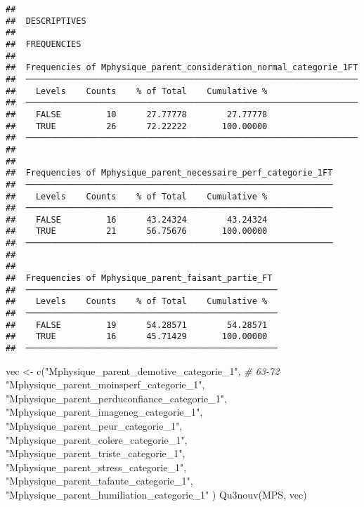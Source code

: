 \documentclass[
]{article}
\newenvironment{Shaded}{\begin{snugshade}}{\end{snugshade}}
\newcommand{\CommentTok}[1]{\textcolor[rgb]{0.56,0.35,0.01}{\textit{#1}}}
\newcommand{\FunctionTok}[1]{\textcolor[rgb]{0.00,0.00,0.00}{#1}}
\newcommand{\NormalTok}[1]{#1}
\newcommand{\OtherTok}[1]{\textcolor[rgb]{0.56,0.35,0.01}{#1}}
\newcommand{\StringTok}[1]{\textcolor[rgb]{0.31,0.60,0.02}{#1}}
\begin{document}
\begin{verbatim}
## 
##  DESCRIPTIVES
## 
##  FREQUENCIES
## 
##  Frequencies of Mphysique_parent_consideration_normal_categorie_1FT 
##  ────────────────────────────────────────────────────────────────── 
##    Levels    Counts    % of Total    Cumulative %   
##  ────────────────────────────────────────────────────────────────── 
##    FALSE         10      27.77778        27.77778   
##    TRUE          26      72.22222       100.00000   
##  ────────────────────────────────────────────────────────────────── 
## 
## 
##  Frequencies of Mphysique_parent_necessaire_perf_categorie_1FT 
##  ───────────────────────────────────────────────────────────── 
##    Levels    Counts    % of Total    Cumulative %   
##  ───────────────────────────────────────────────────────────── 
##    FALSE         16      43.24324        43.24324   
##    TRUE          21      56.75676       100.00000   
##  ───────────────────────────────────────────────────────────── 
## 
## 
##  Frequencies of Mphysique_parent_faisant_partie_FT  
##  ────────────────────────────────────────────────── 
##    Levels    Counts    % of Total    Cumulative %   
##  ────────────────────────────────────────────────── 
##    FALSE         19      54.28571        54.28571   
##    TRUE          16      45.71429       100.00000   
##  ──────────────────────────────────────────────────
\end{verbatim}

\begin{Shaded}
\begin{Highlighting}[]
\NormalTok{vec }\OtherTok{\textless{}{-}} \FunctionTok{c}\NormalTok{(}\StringTok{"Mphysique\_parent\_demotive\_categorie\_1"}\NormalTok{,    }\CommentTok{\# 63{-}72}
     \StringTok{"Mphysique\_parent\_moinsperf\_categorie\_1"}\NormalTok{, }
     \StringTok{"Mphysique\_parent\_perduconfiance\_categorie\_1"}\NormalTok{, }
     \StringTok{"Mphysique\_parent\_imageneg\_categorie\_1"}\NormalTok{, }
     \StringTok{"Mphysique\_parent\_peur\_categorie\_1"}\NormalTok{, }
     \StringTok{"Mphysique\_parent\_colere\_categorie\_1"}\NormalTok{, }
     \StringTok{"Mphysique\_parent\_triste\_categorie\_1"}\NormalTok{, }
     \StringTok{"Mphysique\_parent\_stress\_categorie\_1"}\NormalTok{, }
     \StringTok{"Mphysique\_parent\_tafaute\_categorie\_1"}\NormalTok{, }
     \StringTok{"Mphysique\_parent\_humiliation\_categorie\_1"}
\NormalTok{)}
\FunctionTok{Qu3nouv}\NormalTok{(MPS, vec)}
\end{Highlighting}
\end{Shaded}
\end{document}
